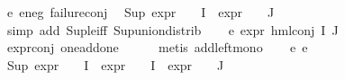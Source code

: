 \begin{isabellebody}
\ e{}{\isacharunderscore}{\kern0pt}{}\ e{}{\isacharunderscore}{\kern0pt}neg\ failure{\isacharunderscore}{\kern0pt}conj\ \isamarkupfalse%
\ {\isachardoublequoteopen}Sup\ {\isacharparenleft}{\kern0pt}{\isacharparenleft}{\kern0pt}expr{\isacharunderscore}{\kern0pt}{}\ {\isasymcirc}\ {\isasymPhi}{\isacharparenright}{\kern0pt}\ {\isacharbackquote}{\kern0pt}\ I\ {\isasymunion}\ {\isacharparenleft}{\kern0pt}expr{\isacharunderscore}{\kern0pt}{}\ {\isasymcirc}\ {\isasymPhi}{\isacharparenright}{\kern0pt}\ {\isacharbackquote}{\kern0pt}\ J{\isacharparenright}{\kern0pt}\ {\isasymle}\ {}{\isachardoublequoteclose}\isanewline
\ \ \ \ \isamarkupfalse%
\ {\isacharparenleft}{\kern0pt}simp\ add{\isacharcolon}{\kern0pt}\ Sup{\isacharunderscore}{\kern0pt}le{\isacharunderscore}{\kern0pt}iff\ Sup{\isacharunderscore}{\kern0pt}union{\isacharunderscore}{\kern0pt}distrib{\isacharparenright}{\kern0pt}\isanewline
\ \ \isamarkupfalse%
\ e{}{\isacharcolon}{\kern0pt}\ {\isachardoublequoteopen}expr{\isacharunderscore}{\kern0pt}{}\ {\isacharparenleft}{\kern0pt}hml{\isacharunderscore}{\kern0pt}conj\ I\ J\ {\isasymPhi}{\isacharparenright}{\kern0pt}\ {\isasymle}\ {}{\isachardoublequoteclose}\ \isanewline
\ \ \ \ \isamarkupfalse%
\ expr{\isacharunderscore}{\kern0pt}{}{\isacharunderscore}{\kern0pt}conj\ one{\isacharunderscore}{\kern0pt}add{\isacharunderscore}{\kern0pt}one\isanewline
\ \ \ \ \isamarkupfalse%
\ {\isacharparenleft}{\kern0pt}metis\ add{\isacharunderscore}{\kern0pt}left{\isacharunderscore}{\kern0pt}mono{\isacharparenright}{\kern0pt}\isanewline
\ \ \isamarkupfalse%
\ e{}{\isacharunderscore}{\kern0pt}{}\ e{}{\isacharunderscore}{\kern0pt}{}\ \isamarkupfalse%
\ {\isachardoublequoteopen}Sup\ {\isacharparenleft}{\kern0pt}{\isacharparenleft}{\kern0pt}expr{\isacharunderscore}{\kern0pt}{}\ {\isasymcirc}\ {\isasymPhi}{\isacharparenright}{\kern0pt}\ {\isacharbackquote}{\kern0pt}\ I\ {\isasymunion}\ {\isacharparenleft}{\kern0pt}expr{\isacharunderscore}{\kern0pt}{}\ {\isasymcirc}\ {\isasymPhi}{\isacharparenright}{\kern0pt}\ {\isacharbackquote}{\kern0pt}\ I\ {\isasymunion}\ {\isacharparenleft}{\kern0pt}expr{\isacharunderscore}{\kern0pt}{}\ {\isasymcirc}\ {\isasymPhi}{\isacharparenright}{\kern0pt}\ {\isacharbackquote}{\kern0pt}\ J{\isacharparenright}{\kern0pt}\ {\isasymle}\ {}{\isachardoublequoteclose}\isanewline

\end{isabellebody}
